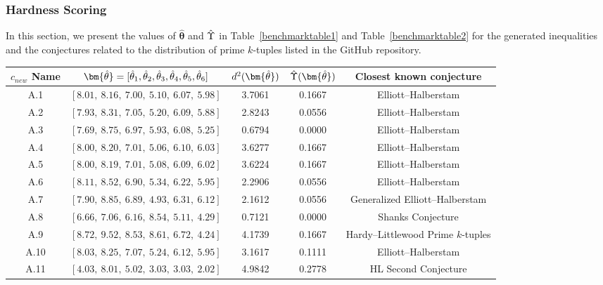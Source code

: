 \documentclass[11pt,reqno]{amsart}
\theoremstyle{plain}\newtheorem{theorem}{Theorem}[section]
\numberwithin{equation}{section}
\begin{document}

\subsubsection{Hardness Scoring}

In this section, we present the values of $\bm{\hat{\theta}}$ and $\Hat{\Upsilon}$ in Table~\ref{benchmarktable1} and Table~\ref{benchmarktable2} for the generated inequalities and the conjectures related to the distribution of prime $k$-tuples listed in the GitHub repository. 

\begin{table}[ht]
\begin{center}
\begin{tabular}{|c|c|c|c|c|}
\hline
$c_{new}$ Name & ${\bm{\Hat{\theta}}}=[{\Hat{\theta}}_1,{\Hat{\theta}}_2,{\Hat{\theta}}_3,{\Hat{\theta}}_4,{\Hat{\theta}}_5,{\Hat{\theta}}_6]$ & $d^2(\bm{\Hat{\theta}})$ & $\Hat{\Upsilon}({\bm{\Hat{\theta}}})$ & Closest known conjecture \\
\hline
A.1  & $[8.01,\ 8.16,\ 7.00,\ 5.10,\ 6.07,\ 5.98]$ & 3.7061 & 0.1667 & Elliott--Halberstam\\
A.2  & $[7.93,\ 8.31,\ 7.05,\ 5.20,\ 6.09,\ 5.88]$ & 2.8243 & 0.0556 & Elliott--Halberstam \\
A.3  & $[7.69,\ 8.75,\ 6.97,\ 5.93,\ 6.08,\ 5.25]$ & 0.6794 & 0.0000 & Elliott--Halberstam \\
A.4  & $[8.00,\ 8.20,\ 7.01,\ 5.06,\ 6.10,\ 6.03]$ & 3.6277 & 0.1667 & Elliott--Halberstam \\
A.5  & $[8.00,\ 8.19,\ 7.01,\ 5.08,\ 6.09,\ 6.02]$ & 3.6224 & 0.1667 & Elliott--Halberstam \\
A.6  & $[8.11,\ 8.52,\ 6.90,\ 5.34,\ 6.22,\ 5.95]$ & 2.2906 & 0.0556 & Elliott--Halberstam \\
A.7  & $[7.90,\ 8.85,\ 6.89,\ 4.93,\ 6.31,\ 6.12]$ & 2.1612 & 0.0556 & Generalized Elliott--Halberstam \\
A.8  & $[6.66,\ 7.06,\ 6.16,\ 8.54,\ 5.11,\ 4.29]$ & 0.7121 & 0.0000 & Shanks Conjecture\\
A.9  & $[8.72,\ 9.52,\ 8.53,\ 8.61,\ 6.72,\ 4.24]$ & 4.1739 & 0.1667 & Hardy--Littlewood Prime $k$-tuples \\
A.10 & $[8.03,\ 8.25,\ 7.07,\ 5.24,\ 6.12,\ 5.95]$ & 3.1617 & 0.1111 & Elliott--Halberstam \\
A.11 & $[4.03,\ 8.01,\ 5.02,\ 3.03,\ 3.03,\ 2.02]$ & 4.9842 & 0.2778 & HL Second Conjecture \\

\end{tabular}
\end{center}
\end{table}
\end{document}

